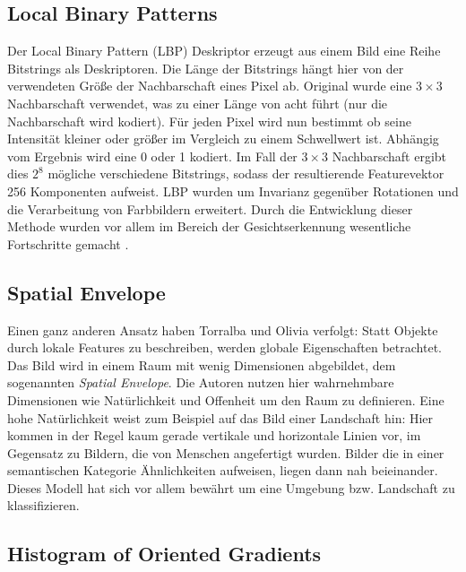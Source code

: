 \subsection{Local Binary Patterns}

Der Local Binary Pattern (LBP) Deskriptor erzeugt aus einem Bild eine Reihe Bitstrings als Deskriptoren. Die Länge der Bitstrings hängt hier von der verwendeten Größe der Nachbarschaft eines Pixel ab. Original wurde eine $3 \times 3$ Nachbarschaft verwendet, was zu einer Länge von acht führt (nur die Nachbarschaft wird kodiert). Für jeden Pixel wird nun bestimmt ob seine Intensität kleiner oder größer im Vergleich zu einem Schwellwert ist. Abhängig vom Ergebnis wird eine 0 oder 1 kodiert. Im Fall der $3 \times 3$ Nachbarschaft ergibt dies $2^8$ mögliche verschiedene Bitstrings, sodass der resultierende Featurevektor 256 Komponenten aufweist. LBP wurden um Invarianz gegenüber Rotationen und die Verarbeitung von Farbbildern erweitert. Durch die Entwicklung dieser Methode wurden vor allem im Bereich der Gesichtserkennung wesentliche Fortschritte gemacht \cite{lbp2002}.

\subsection{Spatial Envelope}

Einen ganz anderen Ansatz haben Torralba und Olivia \cite{mts2001} verfolgt: Statt Objekte durch lokale Features zu beschreiben, werden globale Eigenschaften betrachtet. Das Bild wird in einem Raum mit wenig Dimensionen abgebildet, dem sogenannten \textit{Spatial Envelope}. Die Autoren nutzen hier wahrnehmbare Dimensionen wie Natürlichkeit und Offenheit um den Raum zu definieren. Eine hohe Natürlichkeit weist zum Beispiel auf das Bild einer Landschaft hin: Hier kommen in der Regel kaum gerade vertikale und horizontale Linien vor, im Gegensatz zu Bildern, die von Menschen angefertigt wurden.  Bilder die in einer semantischen Kategorie Ähnlichkeiten aufweisen, liegen dann nah beieinander. Dieses Modell hat sich vor allem bewährt um eine Umgebung bzw. Landschaft zu klassifizieren. 

\subsection{Histogram of Oriented Gradients}

